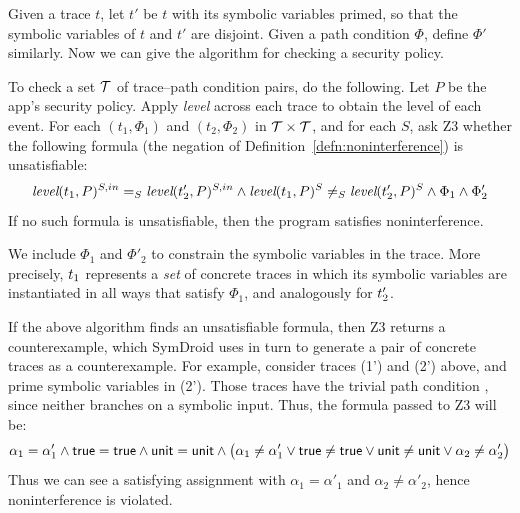 Given a trace
$t$, let $t'$ be $t$ with its symbolic variables primed, so that the
symbolic variables of $t$ and $t'$ are disjoint. Given a path
condition $\Phi$, define $\Phi'$ similarly. Now we can give the
algorithm for checking a security policy.

\begin{algorithm}
  To check a set $\mathcal{T}$ of trace--path condition pairs, do the
  following. Let $P$ be the app's security policy. Apply \emph{level}
  across each trace to obtain the level of each event.  For each
  $(t_1, \Phi_1)$ and $(t_2, \Phi_2)$ in $\mathcal{T}\times\mathcal{T}$, and for
  each $S$, ask Z3 whether the following formula (the negation of
  Definition~\ref{defn:noninterference}) is unsatisfiable:
  \begin{displaymath}
    \textit{level}(t_1, P)^{S,in} =_S \textit{level}(t_2', P)^{S,in} \land
    \textit{level}(t_1, P)^S \neq_S \textit{level}(t_2', P)^S \land
    \Phi_1 \land \Phi_2' \\
  \end{displaymath}
  If no such formula is unsatisfiable, then the program satisfies noninterference.
\end{algorithm}
%
We include $\Phi_1$ and $\Phi'_2$ to
constrain the symbolic variables in the trace. More precisely,
$t_1$ represents a \emph{set} of concrete traces in which its symbolic
variables are instantiated in all ways that satisfy $\Phi_1$,
and analogously for $t'_2$.

If the above algorithm finds an unsatisfiable formula, then Z3 returns a counterexample, which
SymDroid uses in turn to generate a pair of concrete traces
as a counterexample.
For example, consider traces (1') and (2') above, and prime
symbolic variables in (2'). Those traces have the trivial path
condition , since neither branches on a symbolic
input. Thus, the formula passed to Z3 will be:
\begin{displaymath}
  \alpha_1 = \alpha'_1 \land \textsf{true} = \textsf{true} \land \textsf{unit} = \textsf{unit}
  \land
  \big(\alpha_1 \neq \alpha'_1 \vee \textsf{true} \neq \textsf{true} \vee
  \textsf{unit} \neq \textsf{unit} \vee \alpha_2 \neq \alpha'_2 \big)
\end{displaymath}
Thus we can see a satisfying
assignment with $\alpha_1 = \alpha'_1$ and $\alpha_2 \neq \alpha'_2$,
hence noninterference is violated.


